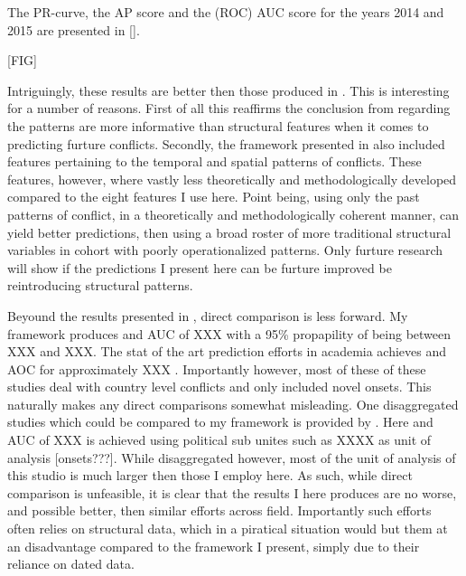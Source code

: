 \documentclass[a4paper]{article}
\begin{document}
The PR-curve, the AP score and the (ROC) AUC score for the years 2014 and 2015 are presented in \autoref{}.\par 

[FIG]

Intriguingly, these results are better then those produced in \cite{Maase}. This is interesting for a number of reasons. First of all this reaffirms the conclusion from \cite{Maase} regarding the patterns are more informative than structural features when it comes to predicting furture conflicts. Secondly, the framework presented in \cite{Maase} also included features pertaining to the temporal and spatial patterns of conflicts. These features, however, where vastly less theoretically and methodologically developed compared to the eight features I use here. Point being, using only the past patterns of conflict, in a theoretically and methodologically coherent manner, can yield better predictions, then using a broad roster of more traditional structural variables in cohort with poorly operationalized patterns. Only furture research will show if the predictions I present here can be furture improved be reintroducing structural patterns.\par

Beyound the results presented in \cite{Maase}, direct comparison is less forward. My framework produces and AUC of XXX with a 95\% propapility of being between XXX and XXX. The stat of the art prediction efforts in academia achieves and AOC for approximately XXX \citep[XX]{chadefaux2017conflict}. Importantly however, most of these of these studies deal with country level conflicts and only included novel onsets\citep[XXX]{chadefaux2017conflict}. This naturally makes any direct comparisons somewhat misleading. One disaggregated studies which could be compared to my framework is provided by \cite{perry_2013}. Here and AUC of XXX is achieved using political sub unites such as XXXX as unit of analysis [onsets???]. While disaggregated however, most of the unit of analysis of this studio is much larger then those I employ here. As such, while direct comparison is unfeasible, it is clear that the results I here produces are no worse, and possible better, then similar efforts across field. Importantly such efforts often relies on structural data, which in a piratical situation would but them at an disadvantage compared to the framework I present, simply due to their reliance on dated data.\par
\end{document}
